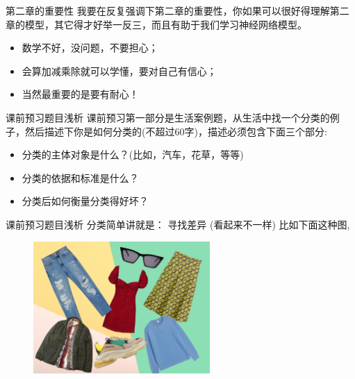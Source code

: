 \documentclass[handout]{ctexbeamer}
\begin{document}
\begin{frame}{第二章的重要性}
	我要在反复强调下第二章的重要性，你如果可以很好得理解第二章的模型，其它得才好举一反三，而且有助于我们学习神经网络模型。
	
	\hfil
	
	\begin{itemize}
	\setlength\itemsep{1em}
		\item 数学不好，没问题，不要担心；
		\item 会算加减乘除就可以学懂，要对自己有信心；
		\item 当然最重要的是要有耐心！
	\end{itemize}
\end{frame}

\begin{frame}{课前预习题目浅析}
	课前预习第一部分是生活案例题，从生活中找一个分类的例子，然后描述下你是如何分类的(不超过60字)，描述必须包含下面三个部分:
	
	\hfil
	
\begin{itemize}
\setlength\itemsep{1em}
	\item 分类的主体对象是什么？(比如，汽车，花草，等等)
	\item 分类的依据和标准是什么？
	\item 分类后如何衡量分类得好坏？
\end{itemize}
\end{frame}

\begin{frame}[fragile]{课前预习题目浅析}
分类简单讲就是： 寻找差异 (看起来不一样) 比如下面这种图,
\begin{figure}[H]
	\centering
	\includegraphics[width=0.6\textwidth]{fig/clothes}
\end{figure}
\end{frame}
\end{document}

